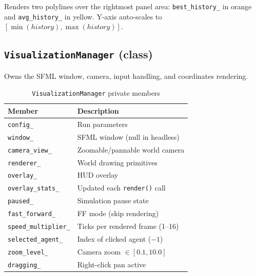 Renders two polylines over the rightmost panel area: \texttt{best\_history\_} in orange
and \texttt{avg\_history\_} in yellow.  Y-axis auto-scales to
$[\min(\mathit{history}), \max(\mathit{history})]$.

\subsection{\texttt{VisualizationManager} (class)}

Owns the SFML window, camera, input handling, and coordinates rendering.

\begin{table}[H]
\centering\small
\caption{\texttt{VisualizationManager} private members}
\begin{tabularx}{\textwidth}{@{}lX@{}}
\toprule
\textbf{Member} & \textbf{Description} \\
\midrule
\texttt{config\_}           & Run parameters \\
\texttt{window\_}           & SFML window (null in headless) \\
\texttt{camera\_view\_}     & Zoomable/pannable world camera \\
\texttt{renderer\_}         & World drawing primitives \\
\texttt{overlay\_}          & HUD overlay \\
\texttt{overlay\_stats\_}   & Updated each \texttt{render()} call \\
\texttt{paused\_}           & Simulation pause state \\
\texttt{fast\_forward\_}    & FF mode (skip rendering) \\
\texttt{speed\_multiplier\_}& Ticks per rendered frame (1–16) \\
\texttt{selected\_agent\_}  & Index of clicked agent ($-1$) \\
\texttt{zoom\_level\_}      & Camera zoom $\in [0.1, 10.0]$ \\
\texttt{dragging\_}         & Right-click pan active \\
\bottomrule
\end{tabularx}
\end{table}

